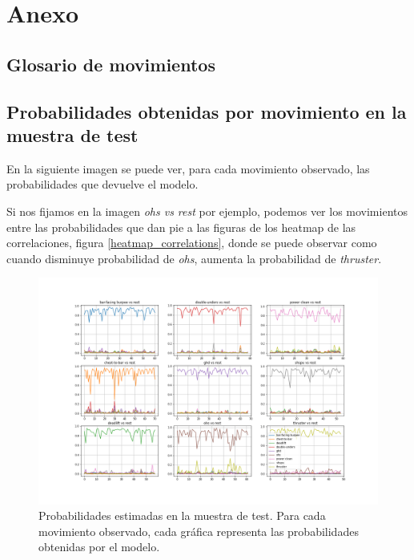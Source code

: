 \chapter{Anexo}

\section{Glosario de movimientos}



\section{Probabilidades obtenidas por movimiento en la muestra de test}\label{Probabilidades}

En la siguiente imagen se puede ver, para cada movimiento observado, las probabilidades que devuelve el modelo.

Si nos fijamos en la imagen \textit{ohs vs rest} por ejemplo, podemos ver los movimientos entre las probabilidades que dan pie a las figuras de los heatmap de las correlaciones, figura \ref{heatmap_correlations}, donde se puede observar como cuando disminuye probabilidad de \textit{ohs}, aumenta la probabilidad de \textit{thruster}.

\begin{figure}[H]
    \centering
		\includegraphics[width=\textwidth]{figs/probabilities_by_movement.png}
\caption{Probabilidades estimadas en la muestra de test. Para cada movimiento observado, cada gráfica representa las probabilidades obtenidas por el modelo.}\label{probabilities_by_movement}
\end{figure}



